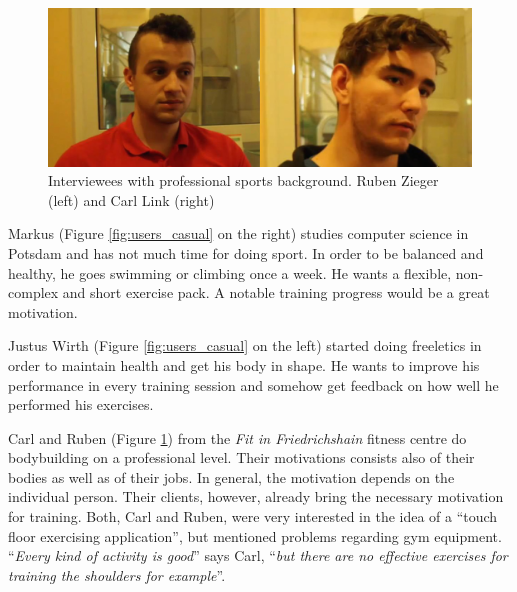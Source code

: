 \documentclass{sigchi}
\begin{document}
    \begin{figure}[ht]
      \centering
      \includegraphics[width=\columnwidth]{users_pro}
      \caption{Interviewees with professional sports background. Ruben Zieger (left) and Carl Link (right)}
      \label{fig:users_pro}
    \end{figure}

    Markus (Figure \ref{fig:users_casual} on the right) studies computer science in Potsdam and has not much time for doing sport. In order to be balanced and healthy, he goes swimming or climbing once a week. He wants a flexible, non-complex and short exercise pack. A notable training progress would be a great motivation.

    Justus Wirth (Figure \ref{fig:users_casual} on the left) started doing freeletics in order to maintain health and get his body in shape. He wants to improve his performance in every training session and somehow get feedback on how well he performed his exercises.

    Carl and Ruben (Figure \ref{fig:users_pro}) from the \emph{Fit in Friedrichshain} fitness centre do bodybuilding on a professional level. Their motivations consists also of their bodies as well as of their jobs. In general, the motivation depends on the individual person. Their clients, however, already bring the necessary motivation for training. Both, Carl and Ruben, were very interested in the idea of a ``touch floor exercising application'', but mentioned problems regarding gym equipment. ``\emph{Every kind of activity is good}'' says Carl, ``\emph{but there are no effective exercises for training the shoulders for example}''. 
\end{document}
